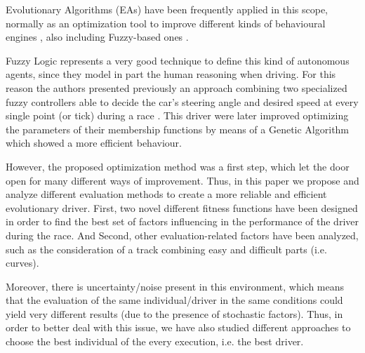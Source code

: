 \documentclass[conference]{IEEEtran}
\begin{document}
Evolutionary Algorithms (EAs) \cite{EAs_Back96} have been frequently applied in this scope, normally as an optimization tool to improve different kinds of behavioural engines \cite{Floreano2004,CarRacing_Pelta09,SAES2012,QuadfliegMO,torcs2012}, also including Fuzzy-based ones \cite{Guadarrama2008, LFAG, PerezEvolvingFuzzy09}.

Fuzzy Logic \cite{Fuzzy2011} represents a very good technique to define this kind of autonomous agents, since they model in part the human reasoning when driving.
For this reason the authors presented previously an approach combining two specialized fuzzy controllers able to decide the car's steering angle and desired speed at every single point (or tick) during a race \cite{evo17}. This driver were later improved \cite{evo18} optimizing the parameters of their membership functions by means of a Genetic Algorithm \cite{GAs_Goldberg89} which showed a more efficient behaviour.

However, the proposed optimization method was a first step, which let the door open for many different ways of improvement. Thus, in this paper we propose and analyze different evaluation methods to create a more reliable and efficient evolutionary driver. First, two novel different fitness functions have been designed in order to find the best set of factors influencing in the performance of the driver during the race.
And Second,  other evaluation-related factors have been analyzed, such as the consideration of a track combining easy and difficult parts (i.e. curves).

Moreover, there is uncertainty/noise present in this environment, which means that the evaluation of the same individual/driver in the same conditions could yield very different results (due to the presence of stochastic factors). Thus, in order to better deal with this issue, we have also studied different approaches to choose the best individual of the every execution, i.e. the best driver.


\end{document}
